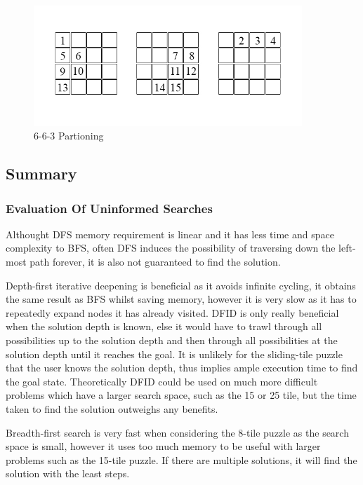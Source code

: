 \documentclass[final]{cmpreport}
\begin{document}
\begin{figure}[ht]
	\centering
	\includegraphics[width=0.9\textwidth]{15tile}
	\captionsetup{justification=centering}
	\caption{6-6-3 Partioning}
	\label{fig:partitioning}
\end{figure}


\subsection{Summary}

\subsubsection{Evaluation Of Uninformed Searches}
Althought DFS memory requirement is linear and it has less time and space complexity to BFS, often DFS induces the possibility of traversing down the left-most path forever, it is also not guaranteed to find the solution.

Depth-first iterative deepening is beneficial as it avoids infinite cycling, it obtains the same result as BFS whilst saving memory, however it is very slow as it has to repeatedly expand nodes it has already visited. DFID is only really beneficial when the solution depth is known, else it would have to trawl through all possibilities up to the solution depth and then through all possibilities at the solution depth until it reaches the goal. It is unlikely for the sliding-tile puzzle that the user knows the solution depth, thus implies ample execution time to find the goal state. Theoretically DFID could be used on much more difficult problems which have a larger search space, such as the 15 or 25 tile, but the time taken to find the solution outweighs any benefits. 

Breadth-first search is very fast when considering the 8-tile puzzle as the search space is small, however it uses too much memory to be useful with larger problems such as the 15-tile puzzle. If there are multiple solutions, it will find the solution with the least steps.
\end{document}
